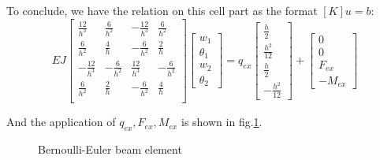 To conclude, 
we have the relation on this cell part as the format $[K]u=b$:
\begin{equation}
    EJ
    \begin{bmatrix}
        \frac{12}{h^3} & \frac{6}{h^2} & -\frac{12}{h^3} & \frac{6}{h^2} \\
        \frac{6}{h^2} & \frac{4}{h} & -\frac{6}{h^2} & \frac{2}{h} \\
        -\frac{12}{h^3} & -\frac{6}{h^2} & \frac{12}{h^3} & -\frac{6}{h^2} \\
        \frac{6}{h^2} & \frac{2}{h} & -\frac{6}{h^2} & \frac{4}{h} \\
       \end{bmatrix}
       \begin{bmatrix}
           w_1\\ \theta_1\\ w_2\\ \theta_2
       \end{bmatrix}
       =
       q_{ex}
       \begin{bmatrix}
        \frac{h}{2}\\
        \frac{h^2}{12}\\
        \frac{h}{2}\\
        -\frac{h^2}{12}
        \end{bmatrix}
        +
        \begin{bmatrix}
            0\\
            0\\
            F_{ex}\\
            -M_{ex}
        \end{bmatrix}
\end{equation}

And the application of $q_{ex}, F_{ex}, M_{ex}$ is shown in fig.\ref{Bernoulli-Euler beam element}.

\begin{figure}[H]
    \centering
    \caption{Bernoulli-Euler beam element}
    \label{Bernoulli-Euler beam element}
\end{figure}

